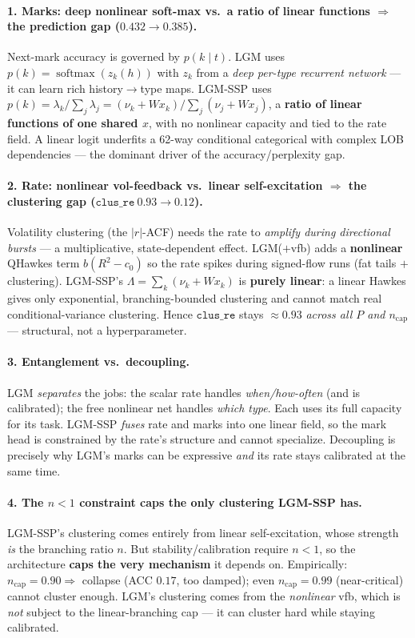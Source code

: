 \documentclass[11pt]{article}
\newcommand{\Lam}{\Lambda}
\begin{document}
\paragraph{1. Marks: deep nonlinear soft-max vs.\ a ratio of linear functions $\Rightarrow$ the prediction gap ($0.432\to0.385$).}
Next-mark accuracy is governed by $p(k\mid t)$. LGM uses $p(k)=\operatorname{softmax}(z_k(h))$ with
$z_k$ from a \emph{deep per-type recurrent network} --- it can learn rich history$\to$type maps. LGM-SSP
uses $p(k)=\lambda_k/\sum_j\lambda_j=(\nu_k+Wx_k)/\sum_j(\nu_j+Wx_j)$, a \textbf{ratio of linear
functions of one shared $x$}, with no nonlinear capacity and tied to the rate field. A linear logit
underfits a 62-way conditional categorical with complex LOB dependencies --- the dominant driver of
the accuracy/perplexity gap.

\paragraph{2. Rate: nonlinear vol-feedback vs.\ linear self-excitation $\Rightarrow$ the clustering gap ($\mathtt{clus\_re}\ 0.93\to0.12$).}
Volatility clustering (the $|r|$-ACF) needs the rate to \emph{amplify during directional bursts} --- a
multiplicative, state-dependent effect. LGM($+$vfb) adds a \textbf{nonlinear} QHawkes term
$b(R^2-c_0)$ so the rate spikes during signed-flow runs (fat tails $+$ clustering). LGM-SSP's
$\Lam=\sum_k(\nu_k+Wx_k)$ is \textbf{purely linear}: a linear Hawkes gives only exponential,
branching-bounded clustering and cannot match real conditional-variance clustering. Hence
$\mathtt{clus\_re}$ stays $\approx0.93$ \emph{across all $P$ and $n_{\mathrm{cap}}$} --- structural, not
a hyperparameter.

\paragraph{3. Entanglement vs.\ decoupling.}
LGM \emph{separates} the jobs: the scalar rate handles \emph{when/how-often} (and is calibrated); the
free nonlinear net handles \emph{which type}. Each uses its full capacity for its task. LGM-SSP
\emph{fuses} rate and marks into one linear field, so the mark head is constrained by the rate's
structure and cannot specialize. Decoupling is precisely why LGM's marks can be expressive \emph{and}
its rate stays calibrated at the same time.

\paragraph{4. The $n<1$ constraint caps the only clustering LGM-SSP has.}
LGM-SSP's clustering comes entirely from linear self-excitation, whose strength \emph{is} the branching
ratio $n$. But stability/calibration require $n<1$, so the architecture \textbf{caps the very mechanism}
it depends on. Empirically: $n_{\mathrm{cap}}=0.90\Rightarrow$ collapse (ACC $0.17$, too damped); even
$n_{\mathrm{cap}}=0.99$ (near-critical) cannot cluster enough. LGM's clustering comes from the
\emph{nonlinear} vfb, which is \emph{not} subject to the linear-branching cap --- it can cluster hard
while staying calibrated.
\end{document}
